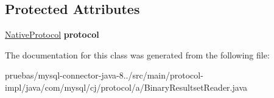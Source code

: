 \subsection*{Protected Attributes}
\begin{DoxyCompactItemize}
\item 
\mbox{\label{classcom_1_1mysql_1_1cj_1_1protocol_1_1a_1_1_binary_resultset_reader_a959b57d9bb0eb1092dc414611100a121}} 
\mbox{\hyperlink{classcom_1_1mysql_1_1cj_1_1protocol_1_1a_1_1_native_protocol}{Native\+Protocol}} {\bfseries protocol}
\end{DoxyCompactItemize}


The documentation for this class was generated from the following file\+:\begin{DoxyCompactItemize}
\item 
pruebas/mysql-\/connector-\/java-\/8../src/main/protocol-\/impl/java/com/mysql/cj/protocol/a/Binary\+Resultset\+Reader.\+java\end{DoxyCompactItemize}
